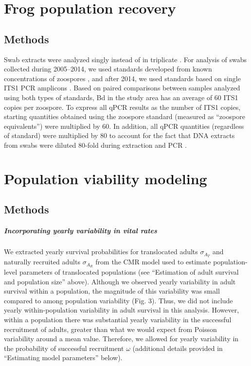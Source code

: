 \documentclass[9pt,twoside,lineno]{pnas-new}
\begin{document}
\hypertarget{frog-population-recovery-2}{%
\section{Frog population
recovery}\label{frog-population-recovery-2}}

\hypertarget{methods-1}{%
\subsection{Methods}\label{methods-1}}

Swab extracts were analyzed singly instead of in triplicate
\citep{kriger2006}. For analysis of swabs collected during 2005--2014,
we used standards developed from known concentrations of zoospores
\citep{boyle2004}, and after 2014, we used standards based on single
ITS1 PCR amplicons \citep{longo2013}. Based on paired comparisons
between samples analyzed using both types of standards, Bd in the study
area has an average of 60 ITS1 copies per zoospore. To express all qPCR
results as the number of ITS1 copies, starting quantities obtained using
the zoospore standard (measured as ``zoospore equivalents'') were
multiplied by 60. In addition, all qPCR quantities (regardless of
standard) were multiplied by 80 to account for the fact that DNA
extracts from swabs were diluted 80-fold during extraction and PCR
\citep{vredenburg2010}.

\hypertarget{population-viability-modeling-1}{%
\section{Population viability
modeling}\label{population-viability-modeling-1}}

\hypertarget{methods-2}{%
\subsection{Methods}\label{methods-2}}

\hypertarget{incorporating-yearly-variability-in-vital-rates}{%
\subparagraph{Incorporating yearly variability in vital
rates}\label{incorporating-yearly-variability-in-vital-rates}}

We extracted yearly survival probabilities for translocated adults
\(\sigma_{A_T}\) and naturally recruited adults \(\sigma_{A_R}\) from
the CMR model used to estimate population-level parameters of
translocated populations (see ``Estimation of adult survival and
population size'' above). Although we observed yearly variability in
adult survival within a population, the magnitude of this variability
was small compared to among population variability
(Fig. 3). Thus, we did not include
yearly within-population variability in adult survival in this analysis.
However, within a population there was substantial yearly variability in
the successful recruitment of adults, greater than what we would expect
from Poisson variability around a mean value. Therefore, we allowed for
yearly variability in the probability of successful recruitment
\(\omega\) (additional details provided in ``Estimating model
parameters'' below).
\end{document}
